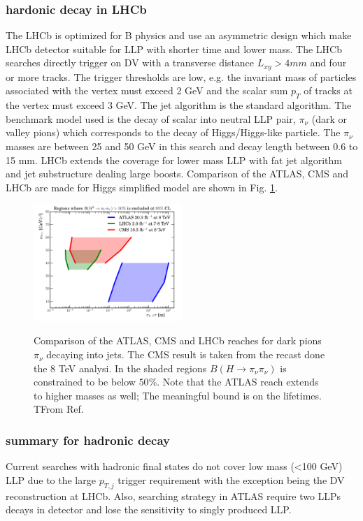 \subsubsection{hardonic decay in LHCb}
The LHCb is optimized for B physics and use an asymmetric design which make LHCb detector suitable for LLP with shorter time and lower mass. The LHCb searches directly trigger on DV with a transverse distance $L_{xy} > 4mm$ and four or more tracks. The trigger thresholds are low, e.g. the invariant mass of particles associated with the vertex must exceed 2 GeV and the scalar sum $p_T$ of tracks at the vertex must exceed 3 GeV. The jet algorithm is the standard algorithm. The benchmark model used is the decay of scalar into neutral LLP pair, $\pi_{\nu}$ (dark or valley pions) which corresponds to the decay of Higgs/Higgs-like particle. The $\pi_{\nu}$  masses are between 25 and 50 GeV in this search and decay length between 0.6 to 15 mm. LHCb extends the coverage for lower mass LLP with fat jet algorithm and jet  substructure dealing large boosts. Comparison of the ATLAS, CMS and LHCb are made for Higgs simplified model are shown in Fig. \ref{fig:LHCbHadronicCompare}.

\begin{figure}
    \centering
    \caption{Comparison of the ATLAS, CMS and LHCb reaches for dark pions $\pi_{\nu}$ decaying into jets. The CMS result is taken from the recast done the 8 TeV analysi. In the shaded regions $B(H\rightarrow\pi_{\nu}\pi_{\nu})$ is constrained to be below $50\%$. Note that the ATLAS reach extends to higher masses as well; The meaningful bound is on the lifetimes. TFrom Ref.\cite{alimena2019searching}}
    \includegraphics[width=0.5\textwidth]{fig/LHCbhadronicCompare.png}
    \label{fig:LHCbHadronicCompare}
\end{figure}


\subsubsection{summary for hadronic decay}
Current searches with hadronic final states do not cover low mass (<100 GeV) LLP due to the large $p_{T,j}$ trigger requirement with the exception being the DV reconstruction at LHCb. Also, searching strategy in ATLAS require two LLPs decays in detector and lose the sensitivity to singly produced LLP. 


